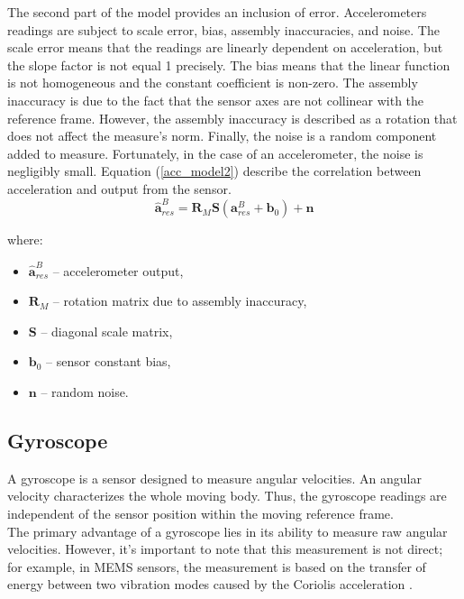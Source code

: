 The second part of the model provides an inclusion of error. Accelerometers readings are subject to scale error, bias, assembly inaccuracies, and noise.
The scale error means that the readings are linearly dependent on acceleration, but the slope factor is not equal 1 precisely. The bias means that the linear function is not homogeneous and the constant coefficient is non-zero. The assembly inaccuracy is due to the fact that the sensor axes are not collinear with the reference frame. However, the assembly inaccuracy is described as a rotation that does not affect the measure's norm. Finally, the noise is a random component added to measure. Fortunately, in the case of an accelerometer, the noise is negligibly small. Equation (\ref{acc_model2}) describe the correlation between acceleration and output from the sensor.\\


\begin{equation}
	\bm{\hat{a}}_{res}^B = \bm{R}_M \bm{S} \left( \bm{a}_{res}^B + \bm{b}_0 \right) + \bm{n}
	\label{acc_model2}
\end{equation}

where:
\begin{itemize}
	\item $\bm{\hat{a}}_{res}^B$ -- accelerometer output,
	\item $\bm{R}_M$ -- rotation matrix due to assembly inaccuracy,
	\item $\bm{S}$ -- diagonal scale matrix,
	\item $\bm{b}_0$ -- sensor constant bias,
	\item $\bm{n}$ -- random noise.	
\end{itemize}



\subsection{Gyroscope}
A gyroscope is a sensor designed to measure angular velocities. An angular velocity characterizes the whole moving body. Thus, the gyroscope readings are independent of the sensor position within the moving reference frame.\\

The primary advantage of a gyroscope lies in its ability to measure raw angular velocities. However, it's important to note that this measurement is not direct; for example, in MEMS sensors, the measurement is based on the transfer of energy between two vibration modes caused by the Coriolis acceleration \cite{passaro2017gyroscope}.\\


